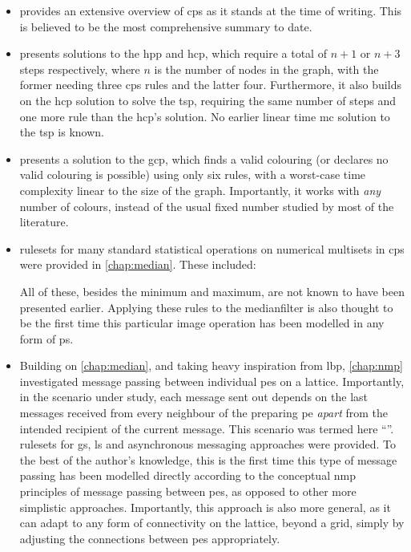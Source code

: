 \begin{itemize}
    \item {} provides an extensive overview of \gls{cps} as it stands at the time of writing.  This is believed to be the most comprehensive summary to date.
    \item {} presents solutions to the \gls{hpp} and \gls{hcp}, which require a total of \(n + 1\) or \(n + 3\) steps respectively, where \(n\) is the number of nodes in the graph, with the former needing three \gls{cps} rules and the latter four.  Furthermore, it also builds on the \gls{hcp} solution to solve the \gls{tsp}, requiring the same number of steps and one more rule than the \gls{hcp}'s solution.  No earlier linear time \gls{mc} solution to the \gls{tsp} is known.
    \item {} presents a solution to the \gls{gcp}, which finds a valid colouring (or declares no valid colouring is possible) using only six rules, with a worst-case time complexity linear to the size of the graph.  Importantly, it works with \emph{any} number of colours, instead of the usual fixed number studied by most of the literature.
    \item \Glspl{ruleset} for many standard statistical operations on numerical multisets in \gls{cps} were provided in \cref{chap:median}.  These included:
    All of these, besides the minimum and maximum, are not known to have been presented earlier.  Applying these rules to the \gls{medianfilter} is also thought to be the first time this particular image operation has been modelled in any form of \gls{ps}.
    \item Building on \cref{chap:median}, and taking heavy inspiration from \gls{lbp}, \cref{chap:nmp} investigated message passing between individual \glspl{pe} on a lattice. Importantly, in the scenario under study, each message sent out depends on the last messages received from every neighbour of the preparing \gls{pe} \emph{apart} from the intended recipient of the current message.  This scenario was termed here ``''.  \Glspl{ruleset} for \gls{gs}, \gls{ls} and asynchronous messaging approaches were provided.  To the best of the author's knowledge, this is the first time this type of message passing has been modelled directly according to the conceptual \gls{nmp} principles of message passing between \glspl{pe}, as opposed to other more simplistic approaches.  Importantly, this approach is also more general, as it can adapt to any form of connectivity on the lattice, beyond a grid, simply by adjusting the connections between \glspl{pe} appropriately.

\end{itemize}
